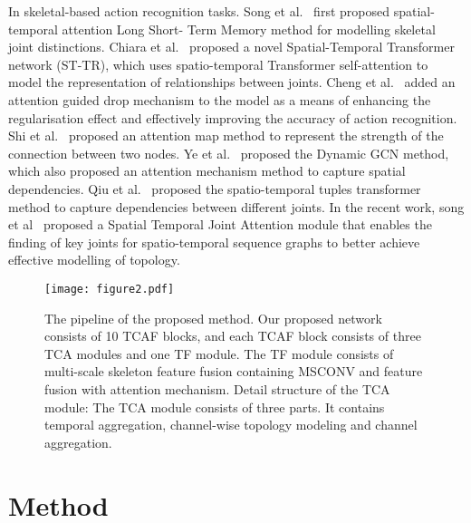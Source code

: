 \documentclass[letterpaper]{article} \usepackage[submission]{aaai23}  \usepackage{times}  \usepackage{helvet}  \usepackage{courier}  \usepackage[hyphens]{url}  \usepackage{graphicx} \urlstyle{rm} \def\UrlFont{\rm}  \usepackage{natbib}  \usepackage{caption} \frenchspacing  \setlength{\pdfpagewidth}{8.5in} \setlength{\pdfpageheight}{11in} \usepackage{algorithm}
\begin{document}
In skeletal-based action recognition tasks. Song et al.~\cite{2016An} first proposed spatial-temporal attention Long Short-
Term Memory method for modelling skeletal joint distinctions. Chiara et al.~\cite{2020sttr} proposed a novel Spatial-Temporal Transformer network (ST-TR), which uses spatio-temporal Transformer self-attention to model the representation of relationships between joints. Cheng et al.~\cite{2020Decoupling} added an attention guided drop mechanism to the model as a means of enhancing the regularisation effect and effectively improving the accuracy of action recognition. Shi et al.~\cite{2017Two} proposed an attention map method to represent the strength of the connection between two nodes. Ye et al.~\cite{2020Dynamic} proposed the Dynamic GCN method, which also proposed an attention mechanism method to capture spatial dependencies. Qiu et al.~\cite{2022Spatioxi} proposed the spatio-temporal tuples transformer method to capture dependencies between different joints. In the recent work, song et al~\cite{song2022constructing} proposed a Spatial Temporal
Joint Attention module that enables the finding of key joints for spatio-temporal sequence graphs to better achieve effective modelling of topology.

















\begin{figure*}[t] 
\centering 
\texttt{[image: figure2.pdf]} 
\caption{The pipeline of the proposed method. Our proposed network consists of 10 TCAF blocks, and each TCAF block consists of three TCA modules and one TF module. The TF module consists of multi-scale skeleton feature fusion containing MSCONV and feature fusion with attention mechanism. Detail structure of the TCA module: The TCA module consists of three parts. It contains temporal aggregation, channel-wise topology modeling and channel aggregation.} 
\label{11} 
\end{figure*}





\section{Method}
\label{sec:blind}
\end{document}
